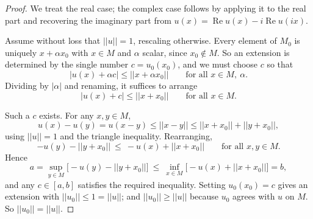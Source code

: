 \documentclass[11pt,a4paper]{article}
\theoremstyle{definition}
\begin{document}
\begin{proof}
We treat the real case; the complex case follows by applying it to the real
part and recovering the imaginary part from
$u(x)=\operatorname{Re}u(x)-i\operatorname{Re}u(ix)$.

Assume without loss that $||u||=1$, rescaling otherwise. Every element of $M_0$
is uniquely $x+\alpha x_0$ with $x\in M$ and $\alpha$ scalar, since
$x_0\notin M$. So an extension is determined by the single number
$c=u_0(x_0)$, and we must choose $c$ so that
$$|u(x)+\alpha c|\leq ||x+\alpha x_0||\qquad\text{for all }x\in M,\ \alpha .$$
Dividing by $|\alpha|$ and renaming, it suffices to arrange
$$|u(x)+c|\leq ||x+x_0||\qquad\text{for all }x\in M .$$

Such a $c$ exists. For any $x,y\in M$,
$$u(x)-u(y)=u(x-y)\leq ||x-y||\leq ||x+x_0||+||y+x_0|| ,$$
using $||u||=1$ and the triangle inequality. Rearranging,
$$-u(y)-||y+x_0||\ \leq\ -u(x)+||x+x_0||\qquad\text{for all }x,y\in M .$$
Hence
$$a=\sup_{y\in M}\big[-u(y)-||y+x_0||\big]\ \leq\
\inf_{x\in M}\big[-u(x)+||x+x_0||\big]=b ,$$
and any $c\in[a,b]$ satisfies the required inequality. Setting $u_0(x_0)=c$
gives an extension with $||u_0||\leq 1=||u||$; and $||u_0||\geq ||u||$ because
$u_0$ agrees with $u$ on $M$. So $||u_0||=||u||$.
\end{proof}
\end{document}
